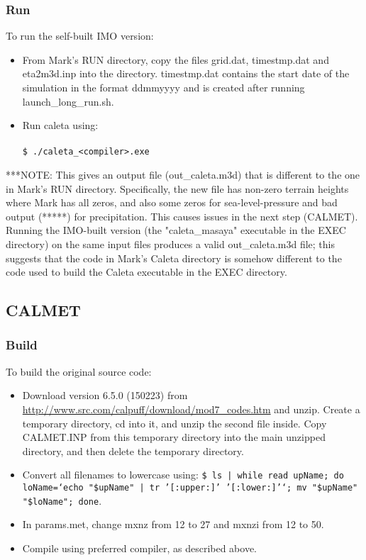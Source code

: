 \documentclass[10pt,a4paper]{article}
\newcommand\tab[1][0.5cm]{\hspace*{#1}}
\begin{document}
\subsubsection{Run}
To run the self-built IMO version:
\begin{itemize}
\item From Mark's RUN directory, copy the files grid.dat, timestmp.dat and eta2m3d.inp into the directory. timestmp.dat contains the start date of the simulation in the format ddmmyyyy and is created after running launch\_long\_run.sh. 
\item Run caleta using:\\\\
\tab \texttt{\$ ./caleta\_<compiler>.exe}
\end{itemize}
***NOTE: This gives an output file (out\_caleta.m3d) that is different to the one in Mark's RUN directory. Specifically, the new file has non-zero terrain heights where Mark has all zeros, and also some zeros for sea-level-pressure and bad output (*****) for precipitation. This causes issues in the next step (CALMET). Running the IMO-built version (the "caleta\_masaya" executable in the EXEC directory) on the same input files produces a valid out\_caleta.m3d file; this suggests that the code in Mark's Caleta directory is somehow different to the code used to build the Caleta executable in the EXEC directory.

\subsection{CALMET}
\subsubsection{Build}
To build the original source code:
\begin{itemize}
\item Download version 6.5.0 (150223) from \url{http://www.src.com/calpuff/download/mod7_codes.htm} and unzip. Create a temporary directory, cd into it, and unzip the second file inside. Copy CALMET.INP from this temporary directory into the main unzipped directory, and then delete the temporary directory.
\item Convert all filenames to lowercase using: \texttt{\$ ls | while read upName; do loName=`echo "\${upName}" | tr '[:upper:]' '[:lower:]'`; mv "\$upName" "\$loName"; done}.
\item In params.met, change mxnz from 12 to 27 and mxnzi from 12 to 50.
\item Compile using preferred compiler, as described above.
\end{itemize}
\end{document}
